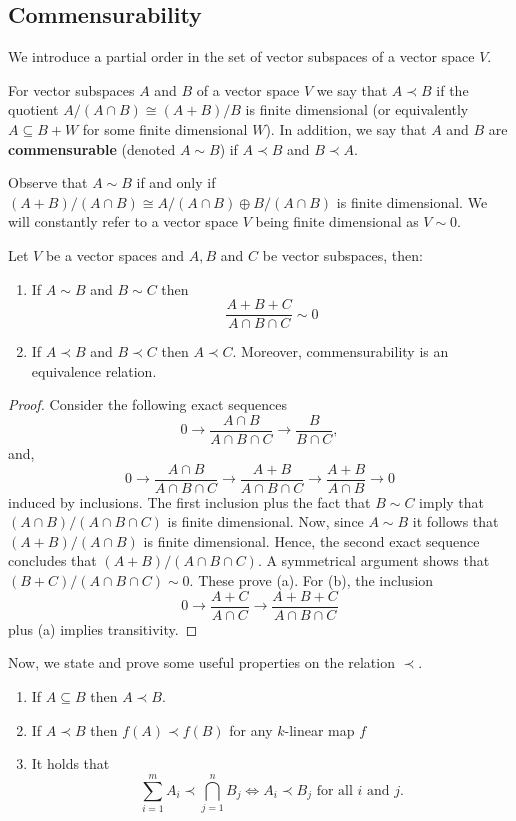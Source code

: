 \subsection*{Commensurability}
We introduce a partial order in the set of vector subspaces of a vector space $V$.
\begin{definition}\label{def:commensurability}
	For vector subspaces $A$ and $B$ of a vector space $V$ we say that $A \prec B$ if the quotient $A/(A\cap B) \cong (A+B)/B$ is finite dimensional (or equivalently $A \subseteq B + W$ for some finite dimensional $W$). In addition, we say that $A$ and $B$ are \textbf{commensurable} (denoted $A \sim B$) if $A \prec B$ and $B \prec A$.
\end{definition}
Observe that $A \sim B$ if and only if $(A+B)/(A\cap B) \cong A/(A\cap B) \oplus B/(A \cap B)$ is finite dimensional. We will constantly refer to a vector space $V$ being finite dimensional as $V \sim 0$.
\begin{proposition}\label{prop:equivalence-relation}
	Let $V$ be a vector spaces and $A,B$ and $C$ be vector subspaces, then:
	\begin{enumerate}[label = (\alph*)]
		\item If $A \sim B$ and $B \sim C$ then
		\[
			\frac{A+B+C}{A \cap B \cap C} \sim 0
		\]
		\item If $A \prec B$ and $B \prec C$ then $A \prec C$. Moreover, commensurability is an equivalence relation.
	\end{enumerate}
\end{proposition}
\begin{proof}
	Consider the following exact sequences
	\[
		0 \to \frac{A\cap B}{A \cap B \cap C} \to \frac{B}{B \cap C}, 
	\]
	and,
	\[
		0 \to \frac{A\cap B}{A \cap B \cap C} \to \frac{A+B}{A \cap B \cap C}
		\to \frac{A+B}{A \cap B} \to 0
	\]
	induced by inclusions. The first inclusion plus the fact that $B \sim C$ imply that $(A\cap B)/(A \cap B \cap C)$ is finite dimensional. Now, since $A \sim B$ it follows that $(A+B)/(A \cap B)$ is finite dimensional. Hence, the second exact sequence concludes that $(A+B)/(A \cap B \cap C)$. A symmetrical argument shows that $(B+C)/(A \cap B \cap C) \sim 0$. These prove (a). For (b), the inclusion
	\[
		0 \to \frac{A+C}{A\cap C} \to \frac{A+B+C}{A \cap B \cap C}
	\]
	plus (a) implies transitivity. 
\end{proof}
Now, we state and prove some useful properties on the relation $\prec$.
\begin{lemma}\label{lemm:properties-order-well-behaved-under-operations}
\begin{enumerate}[label = (\alph*)]
	\item If $A \subseteq B$ then $A \prec B$.
	\item If $A \prec B$ then $f(A) \prec f(B)$ for any $k$-linear map $f$
	\item It holds that
	\[
		\sum_{i=1}^{m} A_{i} \prec \bigcap_{j=1}^{n} B_{j} \iff A_{i} \prec B_{j}\text{ for all } i \text{ and } j.
	\]
\end{enumerate}
\end{lemma}
